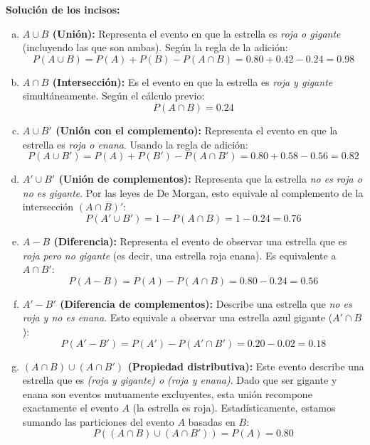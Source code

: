 \documentclass[a4paper]{article}
\begin{document}
\textbf{Solución de los incisos:}

\begin{enumerate}[a.]
    \item \textbf{$A \cup B$ (Unión):} Representa el evento en que la estrella es \textit{roja o gigante} (incluyendo las que son ambas). Según la regla de la adición:
    $$P(A \cup B) = P(A) + P(B) - P(A \cap B) = 0.80 + 0.42 - 0.24 = 0.98$$

    \item \textbf{$A \cap B$ (Intersección):} Es el evento en que la estrella es \textit{roja y gigante} simultáneamente. Según el cálculo previo:
    $$P(A \cap B) = 0.24$$

    \item \textbf{$A \cup B'$ (Unión con el complemento):} Representa el evento en que la estrella es \textit{roja o enana}. Usando la regla de adición:
    $$P(A \cup B') = P(A) + P(B') - P(A \cap B') = 0.80 + 0.58 - 0.56 = 0.82$$

    \item \textbf{$A' \cup B'$ (Unión de complementos):} Representa que la estrella \textit{no es roja o no es gigante}. Por las leyes de De Morgan, esto equivale al complemento de la intersección $(A \cap B)'$:
    $$P(A' \cup B') = 1 - P(A \cap B) = 1 - 0.24 = 0.76$$

    \item \textbf{$A - B$ (Diferencia):} Representa el evento de observar una estrella que es \textit{roja pero no gigante} (es decir, una estrella roja enana). Es equivalente a $A \cap B'$:
    $$P(A - B) = P(A) - P(A \cap B) = 0.80 - 0.24 = 0.56$$

    \item \textbf{$A' - B'$ (Diferencia de complementos):} Describe una estrella que \textit{no es roja y no es enana}. Esto equivale a observar una estrella azul gigante ($A' \cap B$):
    $$P(A' - B') = P(A') - P(A' \cap B') = 0.20 - 0.02 = 0.18$$

    \item \textbf{$(A \cap B) \cup (A \cap B')$ (Propiedad distributiva):} Este evento describe una estrella que es \textit{(roja y gigante) o (roja y enana)}. Dado que ser gigante y enana son eventos mutuamente excluyentes, esta unión recompone exactamente el evento $A$ (la estrella es roja). Estadísticamente, estamos sumando las particiones del evento $A$ basadas en $B$:
    $$P((A \cap B) \cup (A \cap B')) = P(A) = 0.80$$
\end{enumerate}
\end{document}
